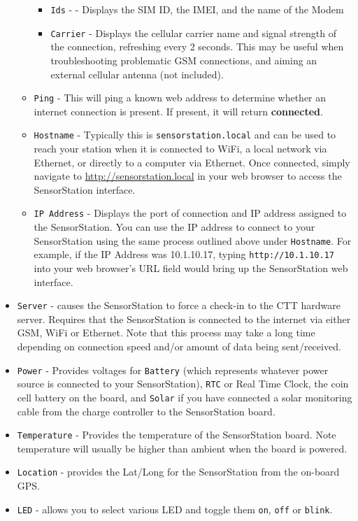 \documentclass[
]{article}
\providecommand{\tightlist}{%
  \setlength{\itemsep}{0pt}\setlength{\parskip}{0pt}}
\begin{document}
\begin{itemize}
\begin{itemize}
    \begin{itemize}
    \tightlist
    \item
      \texttt{Ids} - - Displays the SIM ID, the IMEI, and the name of
      the Modem
    \item
      \texttt{Carrier} - Displays the cellular carrier name and signal
      strength of the connection, refreshing every 2 seconds. This may
      be useful when troubleshooting problematic GSM connections, and
      aiming an external cellular antenna (not included).
    \end{itemize}
  \item
    \texttt{Ping} - This will ping a known web address to determine
    whether an internet connection is present. If present, it will
    return \textbf{connected}.
  \item
    \texttt{Hostname} - Typically this is \texttt{sensorstation.local}
    and can be used to reach your station when it is connected to WiFi,
    a local network via Ethernet, or directly to a computer via
    Ethernet. Once connected, simply navigate to
    \url{http://sensorstation.local} in your web browser to access the
    SensorStation interface.
  \item
    \texttt{IP\ Address} - Displays the port of connection and IP
    address assigned to the SensorStation. You can use the IP address to
    connect to your SensorStation using the same process outlined above
    under \texttt{Hostname}. For example, if the IP Address was
    10.1.10.17, typing \texttt{http://10.1.10.17} into your web
    browser's URL field would bring up the SensorStation web interface.
  \end{itemize}
\item
  \texttt{Server} - causes the SensorStation to force a check-in to the
  CTT hardware server. Requires that the SensorStation is connected to
  the internet via either GSM, WiFi or Ethernet. Note that this process
  may take a long time depending on connection speed and/or amount of
  data being sent/received.
\item
  \texttt{Power} - Provides voltages for \texttt{Battery} (which
  represents whatever power source is connected to your SensorStation),
  \texttt{RTC} or Real Time Clock, the coin cell battery on the board,
  and \texttt{Solar} if you have connected a solar monitoring cable from
  the charge controller to the SensorStation board.
\item
  \texttt{Temperature} - Provides the temperature of the SensorStation
  board. Note temperature will usually be higher than ambient when the
  board is powered.
\item
  \texttt{Location} - provides the Lat/Long for the SensorStation from
  the on-board GPS.
\item
  \texttt{LED} - allows you to select various LED and toggle them
  \texttt{on}, \texttt{off} or \texttt{blink}.


\end{itemize}
\end{document}
